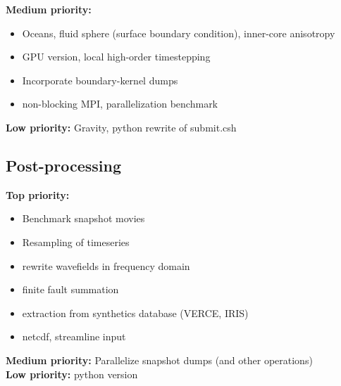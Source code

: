 \documentclass[11pt,letter,fleqn,english,notitlepage]{article}
\begin{document}
\noindent\textbf{Medium priority:}
\begin{itemize}
\item Oceans, fluid sphere (surface boundary condition),
  inner-core anisotropy
\item GPU version, local high-order timestepping
\item Incorporate boundary-kernel dumps
\item non-blocking MPI, parallelization benchmark

\end{itemize}

\noindent\textbf{Low priority:}
Gravity, python rewrite of submit.csh

\subsection{Post-processing}
\noindent\textbf{Top priority:} 
\begin{itemize}
\item Benchmark snapshot movies
\item Resampling of timeseries
\item rewrite wavefields in frequency domain
\item finite fault summation
\item extraction from synthetics database (VERCE, IRIS)
\item netcdf, streamline input
\end{itemize}

\noindent\textbf{Medium priority:}
Parallelize snapshot dumps (and other operations)\\

\noindent\textbf{Low priority:} python version

\end{document}
